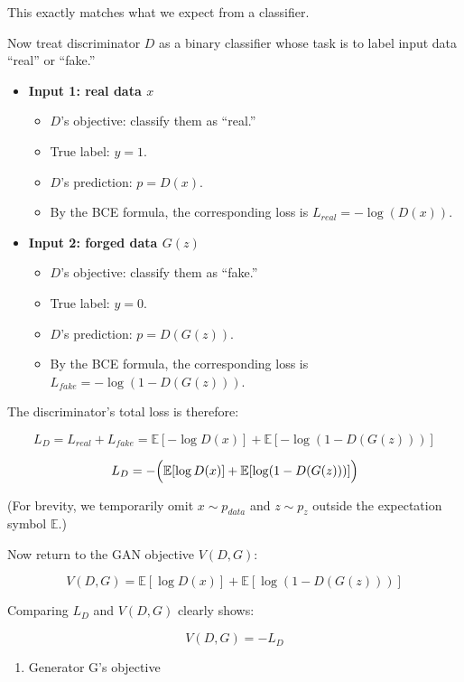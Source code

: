 This exactly matches what we expect from a classifier.

Now treat discriminator \(D\) as a binary classifier whose task is to label input data ``real'' or ``fake.''

\begin{itemize}
\tightlist
\item
  \textbf{Input 1: real data \(x\)}

  \begin{itemize}
  \tightlist
  \item
    \(D\)'s objective: classify them as ``real.''
  \item
    True label: \(y=1\).
  \item
    \(D\)'s prediction: \(p=D(x)\).
  \item
    By the BCE formula, the corresponding loss is \(L_{real}=-\log(D(x))\).
  \end{itemize}
\item
  \textbf{Input 2: forged data \(G(z)\)}

  \begin{itemize}
  \tightlist
  \item
    \(D\)'s objective: classify them as ``fake.''
  \item
    True label: \(y=0\).
  \item
    \(D\)'s prediction: \(p=D(G(z))\).
  \item
    By the BCE formula, the corresponding loss is \(L_{fake}=-\log(1-D(G(z)))\).
  \end{itemize}
\end{itemize}

The discriminator's total loss is therefore:

\[
L_D = L_{real} + L_{fake} = \mathbb{E}[-\log D(x)] + \mathbb{E}[-\log(1-D(G(z)))]
\]

\[
L_D = -\Bigl(\mathbb{E}[\log D(x)] + \mathbb{E}[\log(1-D(G(z)))]\Bigr)
\]

(For brevity, we temporarily omit \(x\sim p_{data}\) and \(z\sim p_z\) outside the expectation symbol \(\mathbb{E}\).)

Now return to the GAN objective \(V(D,G)\):

\[
V(D,G)=\mathbb{E}[\log D(x)] + \mathbb{E}[\log(1-D(G(z)))]
\]

Comparing \(L_D\) and \(V(D,G)\) clearly shows:

\[
V(D,G) = -L_D
\]

\begin{enumerate}
\def\labelenumi{(\arabic{enumi})}
\setcounter{enumi}{1}
\tightlist
\item
  Generator G's objective
\end{enumerate}


